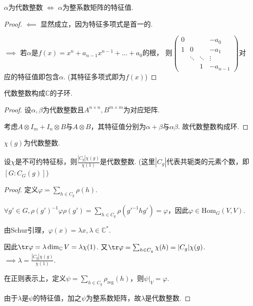 \begin{proposition}[]
    $\alpha$为代数整数 $ \iff $ $\alpha$为整系数矩阵的特征值.
\end{proposition}

\begin{proof}
    $\impliedby$ 显然成立，因为特征多项式是首一的.\par
    $\implies$ 若$\alpha$是$f(x) = x^n + a_{n-1} x^{n-1} + \dots + a_0$的根，
    则$\begin{pmatrix} 0 & & & -a_0 \\ 1 & 0 & & -a_1 \\ & \ddots & \ddots & \vdots \\ & & 1 & -a_{n-1} \end{pmatrix}$对应的特征值即包含$\alpha$. (其特征多项式即为$f(x)$)
\end{proof}

\begin{theorem}[]
    代数整数构成$\mathbb{C}$的子环.
\end{theorem}

\begin{proof}
    设$\alpha, \beta$为代数整数且$A^{n \times n}, B^{m \times m}$为对应矩阵.\par
    考虑$A \otimes I_m + I_n \otimes B$与$A \otimes B$，其特征值分别为$\alpha+\beta$与$\alpha\beta$.
    故代数整数构成环.
\end{proof}

\begin{lemma}[]
    $\chi(g)$为代数整数.
\end{lemma}

\begin{theorem}[]
    设$\chi$是不可约特征标，则$\frac{|C_g| \chi(g)}{\chi(1)}$是代数整数. (这里$|C_g|$代表共轭类的元素个数，即$[G:C_G(g)]$)
\end{theorem}

\begin{proof}
    定义$\varphi = \sum_{h \in C_g} \rho(h)$.\par
    $\forall g' \in G, \rho(g')^{-1} \varphi \rho(g') = \sum_{h \in C_g} \rho(g'^{-1} h g') = \varphi$，因此$\varphi \in \mathrm{Hom}_G(V, V)$.\par
    由Schur引理，$\varphi(x) = \lambda x, \lambda \in \mathbb{C}^*$.\par
    因此$\tr\varphi = \lambda \dim_{\mathbb{C}} V = \lambda \chi(1)$.
    又$\tr \varphi = \sum_{h \in C_g} \chi(h) = |C_g| \chi(g)$.
    $\implies \lambda = \frac{|C_g| \chi(g)}{\chi(1)}$.\par
    在正则表示上，定义$\psi=\sum_{h\in C_g}\rho_{\mathrm{reg}}(h)$，则$\psi|_V=\varphi$.\par
    由于$\lambda$是$\psi$的特征值，加之$\psi$为整系数矩阵，故$\lambda$是代数整数.
\end{proof}

